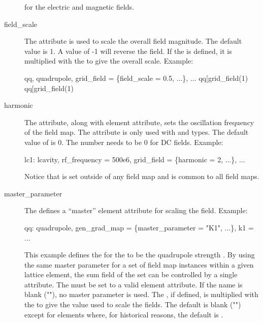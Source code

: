 \begin{description}
for the electric and magnetic fields.
  \item[field_scale] \Newline
The  attribute is used to scale the overall field magnitude. The default
value is 1. A value of -1 will reverse the field. If the  is
defined, it is multiplied with the  to give the overall scale.
Example:
\begin{example}
  qq, quadrupole, grid_field = \{field_scale = 0.5, ...\}, ...
  qq[grid_field(1)%
  qq[grid_field(1)%
\end{example}
  \item[harmonic] \Newline
The  attribute, along with  element attribute, sets the oscillation
frequency of the field map. The  attribute is only used with  and
 types. The default value of  is 0.  The  number needs to
be 0 for DC fields. Example:
\begin{example}
  lc1: lcavity, rf_frequency = 500e6, grid_field = \{harmonic = 2, ...\}, ...
\end{example}
Notice that  is set outside of any field map and is common to all field maps.
  \item[master_parameter] \Newline
The  defines a ``master'' element attribute for scaling the field. Example:
\begin{example}
  qq: quadrupole, gen_grad_map = \{master_parameter = "K1", ...\}, k1 = ...
\end{example}
This example defines the  for the  to be the
quadrupole strength . By using the same master parameter for a set of field map
instances within a given lattice element, the sum field of the set can be controlled by a
single attribute. The  must be set to a valid element attribute. If
the name is blank (""), no master parameter is used. The , if
defined, is multiplied with the  to give the value used to scale the
fields. The default  is blank ("") except for  elements
where, for historical reasons, the default is .


\end{description}
